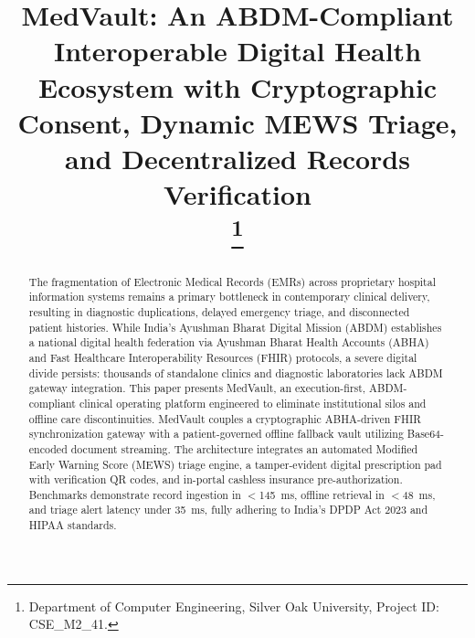 \documentclass[conference]{IEEEtran}
\begin{document}
\title{MedVault: An ABDM-Compliant Interoperable Digital Health Ecosystem with Cryptographic Consent, Dynamic MEWS Triage, and Decentralized Records Verification\\
\thanks{Department of Computer Engineering, Silver Oak University, Project ID: CSE\_M2\_41.}
}

\author{
\and
{}
\and
{}
}

\maketitle

\begin{abstract}
The fragmentation of Electronic Medical Records (EMRs) across proprietary hospital information systems remains a primary bottleneck in contemporary clinical delivery, resulting in diagnostic duplications, delayed emergency triage, and disconnected patient histories. While India's Ayushman Bharat Digital Mission (ABDM) establishes a national digital health federation via Ayushman Bharat Health Accounts (ABHA) and Fast Healthcare Interoperability Resources (FHIR) protocols, a severe digital divide persists: thousands of standalone clinics and diagnostic laboratories lack ABDM gateway integration. This paper presents MedVault, an execution-first, ABDM-compliant clinical operating platform engineered to eliminate institutional silos and offline care discontinuities. MedVault couples a cryptographic ABHA-driven FHIR synchronization gateway with a patient-governed offline fallback vault utilizing Base64-encoded document streaming. The architecture integrates an automated Modified Early Warning Score (MEWS) triage engine, a tamper-evident digital prescription pad with verification QR codes, and in-portal cashless insurance pre-authorization. Benchmarks demonstrate record ingestion in $<$145~ms, offline retrieval in $<$48~ms, and triage alert latency under 35~ms, fully adhering to India's DPDP Act 2023 and HIPAA standards.
\end{abstract}
\end{document}
